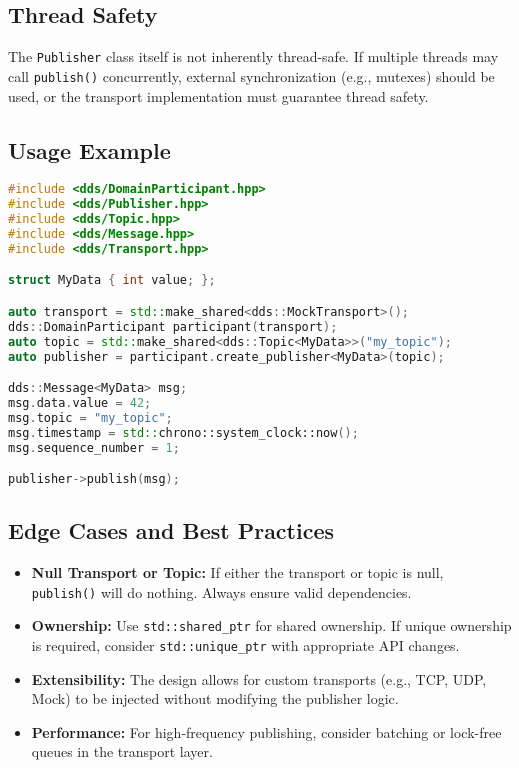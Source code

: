 \documentclass[12pt]{report}
\begin{document}
\subsection{Thread Safety}
The \texttt{Publisher} class itself is not inherently thread-safe. If multiple threads may call \texttt{publish()} concurrently, external synchronization (e.g., mutexes) should be used, or the transport implementation must guarantee thread safety.

\subsection{Usage Example}
\begin{lstlisting}[language=C++]
#include <dds/DomainParticipant.hpp>
#include <dds/Publisher.hpp>
#include <dds/Topic.hpp>
#include <dds/Message.hpp>
#include <dds/Transport.hpp>

struct MyData { int value; };

auto transport = std::make_shared<dds::MockTransport>();
dds::DomainParticipant participant(transport);
auto topic = std::make_shared<dds::Topic<MyData>>("my_topic");
auto publisher = participant.create_publisher<MyData>(topic);

dds::Message<MyData> msg;
msg.data.value = 42;
msg.topic = "my_topic";
msg.timestamp = std::chrono::system_clock::now();
msg.sequence_number = 1;

publisher->publish(msg);
\end{lstlisting}

\subsection{Edge Cases and Best Practices}
\begin{itemize}
    \item \textbf{Null Transport or Topic:} If either the transport or topic is null, \texttt{publish()} will do nothing. Always ensure valid dependencies.
    \item \textbf{Ownership:} Use \texttt{std::shared\_ptr} for shared ownership. If unique ownership is required, consider \texttt{std::unique\_ptr} with appropriate API changes.
    \item \textbf{Extensibility:} The design allows for custom transports (e.g., TCP, UDP, Mock) to be injected without modifying the publisher logic.
    \item \textbf{Performance:} For high-frequency publishing, consider batching or lock-free queues in the transport layer.
\end{itemize}
\end{document}
